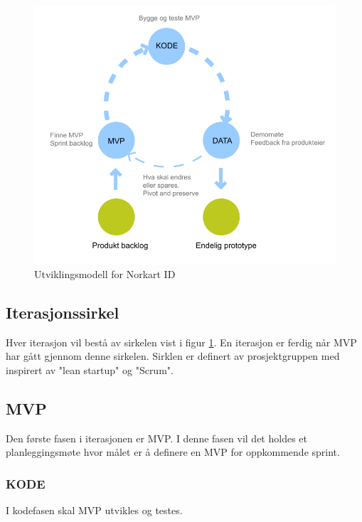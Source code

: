 \pagebreak
\begin{figure}[!htbp]
    \begin{center}
        \includegraphics[scale=0.80]{graphics/UtviklingsModell}
        \caption{Utviklingsmodell for Norkart ID}
        \label{fig:utviklingsmodell}
    \end{center}
\end{figure}

\subsection{Iterasjonssirkel}
\label{app:arbeidsmetode_arbeidsmetodikk_iterasjonssirkerl}
Hver iterasjon vil bestå av sirkelen vist i figur \ref{fig:utviklingsmodell}. En iterasjon er ferdig når MVP har gått gjennom denne sirkelen. Sirklen er definert av prosjektgruppen med inspirert av "lean startup" og "Scrum".

\subsection*{MVP}
Den første fasen i iterasjonen er MVP. I denne fasen vil det holdes et planleggingsmøte hvor målet er å definere en MVP for oppkommende sprint.

\subsubsection*{KODE}
I kodefasen skal MVP utvikles og testes.

